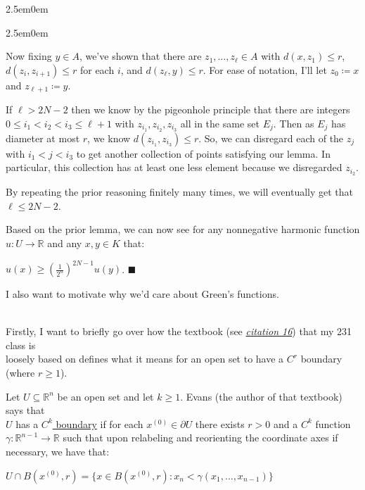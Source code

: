 \documentclass{book}
\newcommand{\inLinkRap}[2]{{\color{blue}\hyperlink{#1}{\textit{#2}}}}
\newcommand{\hTwo}{%
\color{Black}%
   \fontsize{13}{15}\selectfont%
}
\newcommand{\pracOne}{
   \color{BrickRed}%
   \fontsize{13}{15}\selectfont%
}
\newenvironment{myIndent}{%
   \begin{adjustwidth}{2.5em}{0em}%
}{%
   \end{adjustwidth}%
}
\newcommand{\udefine}[1]{{%
   \setulcolor{Red}%
   \setul{0.14em}{0.07em}%
   \ul{#1}%
}}
\newcommand{\mySepTwo}[1][.]{%
   {\noindent\color{#1}{\rule{6.5in}{0.5mm}}}\\%
}
\newcommand{\retTwo}{\hfill\bigbreak}
\begin{document}
\begin{myIndent}
\begin{myIndent}
		Now fixing $y \in A$, we've shown that there are $z_1, \ldots, z_{\ell} \in A$ with $d(x, z_1) \leq r$, $d(z_i, z_{i+1}) \leq r$ for each $i$, and $d(z_\ell, y)\leq r$. For ease of notation, I'll let $z_0 \coloneqq x$ and $z_{\ell + 1} \coloneqq y$.\newpage

		If $\ell > 2N - 2$ then we know by the pigeonhole principle that there are integers $0 \leq i_1 < i_2 < i_3 \leq \ell + 1$ with $z_{i_1}, z_{i_2}, z_{i_3}$ all in the same set $E_j$. Then as $E_j$ has diameter at most $r$, we know $d(z_{i_1}, z_{i_3}) \leq r$. So, we can disregard each of the $z_j$ with $i_1 < j < i_3$ to get another collection of points satisfying our lemma. In particular, this collection has at least one less element because we disregarded $z_{i_2}$.\retTwo

		By repeating the prior reasoning finitely many times, we will eventually get that\\ $\ell \leq 2N - 2$.\retTwo
	\end{myIndent}

	Based on the prior lemma, we can now see for any nonnegative harmonic function\\ $u: U \to \mathbb{R}$ and any $x, y \in K$ that:

	{\centering $ u(x) \geq \left(\frac{1}{2^n}\right)^{2N - 1}u(y)$. $\blacksquare$\retTwo\par}
\end{myIndent}

\hTwo I also want to motivate why we'd care about {\color{OliveGreen}Green's functions}.\retTwo

\pracOne\mySepTwo
Firstly, I want to briefly go over how the textbook (see \inLinkRap{Citation 16}{citation 16}) that my 231 class is\\ loosely based on defines what it means for an open set to have a $C^r$ boundary (where $r \geq 1$).\retTwo

Let $U \subseteq \mathbb{R}^n$ be an open set and let $k \geq 1$. Evans (the author of that textbook) says that\\ $U$ has a \udefine{$C^k$ boundary} if for each $x^{(0)} \in \partial U$ there exists $r > 0$ and a $C^k$ function\\ $\gamma: \mathbb{R}^{n-1} \to \mathbb{R}$ such that upon relabeling and reorienting the coordinate axes if necessary, we have that:

{\centering $U \cap B(x^{(0)}, r) = \{x \in B(x^{(0)}, r) : x_n < \gamma(x_1, \ldots, x_{n-1})\}$ \retTwo\par}
\end{document}
